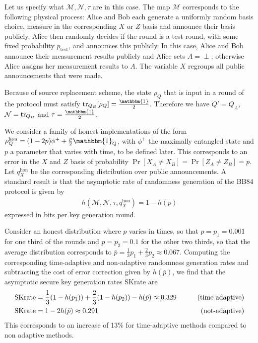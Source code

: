 \documentclass[11pt]{article}
\newcommand{\1}{\ensuremath{\mathbbm{1}}}
\theoremstyle{newdefinition}
\theoremstyle{newplain}
\theoremstyle{myplain}
\begin{document}
Let us specify what $\mathcal M,\mathcal N,\tau$ are in this case. The map $\mathcal M$ corresponds to the following physical process: Alice and Bob each generate a uniformly random basis choice, measure in the corresponding $X$ or $Z$ basis and announce their basis publicly. Alice then randomly decides if the round is a test round, with some fixed probability $p_{\mathrm{test}}$, and announces this publicly. In this case, Alice and Bob announce their measurement results publicly and Alice sets $A = \perp$; otherwise Alice assigns her measurement results to $A$. The variable $X$ regroups all public announcements that were made. 

Because of source replacement scheme, the state $\rho_{Q}$ that is input in a round of the protocol must satisfy $\tr_{Q_B}[\rho_{Q}] = \frac{\1}{2}$. Therefore we have $Q' = Q_A$, $\mathcal N = \tr_{Q_B}$ and $\tau = \frac{\1}{2}$.

We consider a family of honest implementations of the form $\rho^{\mathrm{hon}}_{Q} = (1-2p)\phi^+ + \frac{p}{2} \1_Q$, with $\phi^+$ the maximally entangled state and $p$ a parameter that varies with time, to be defined later. This corresponds to an error in the $X$ and $Z$ basis of probability $\Pr[X_A\neq X_B] = \Pr[Z_A \neq Z_B] = p$. Let $q_{X}^{\mathrm{hon}}$ be the corresponding distribution over public announcements. A standard result is that the asymptotic rate of randomness generation of the BB84 protocol is given by
\begin{align}
    h(\mathcal M,\mathcal N,\tau,q_{X}^{\mathrm{hon}}) = 1 - h(p)
\end{align}
expressed in bits per key generation round.

Consider an honest distribution where $p$ varies in times, so that $p=p_1=0.001$ for one third of the rounds and $p=p_2=0.1$ for the other two thirds, so that the average distribution corresponds to $\bar p = \frac{1}{3} p_1 + \frac{2}{3} p_2\approx 0.067$. Computing the corresponding time-adaptive and non-adaptive randomness generation rates and subtracting the cost of error correction given by $h(\bar p)$, we find that the asymptotic secure key generation rates \textup{SKrate} are
\begin{align}
    \textup{SKrate} &= \frac{1}{3}(1- h(p_1)) + \frac{2}{3} (1-h(p_2)) - h(\bar p) \approx 0.329 &\qquad \text{(time-adaptive)}\\
    \textup{SKrate} &= 1- 2 h(\bar p) \approx 0.291 &\qquad \text{(not-adaptive)}
\end{align}
This corresponds to an increase of 13\% for time-adaptive methods compared to non adaptive methods.
\end{document}
